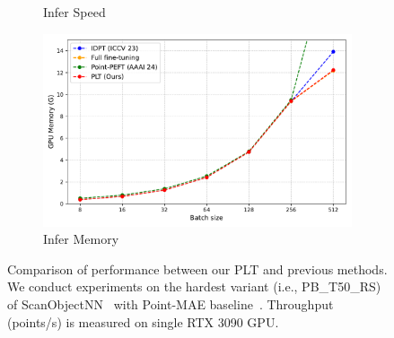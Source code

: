 \begin{figure}
\begin{subfigure}{0.46\textwidth}
        \caption{Infer Speed}
        \label{fig:per3}
    \end{subfigure}
    \hfill
    \begin{subfigure}{0.46\textwidth}
        \centering
        \includegraphics[width=\linewidth]{fig/supplement/performance/infer_memory.pdf}
        \caption{Infer Memory}
        \label{fig:per4}
    \end{subfigure}
    \hfill
    \caption{Comparison of performance between our PLT and previous methods. We conduct experiments on the hardest variant (i.e., PB\_T50\_RS) of ScanObjectNN~\cite{uy2019revisiting} with Point-MAE baseline~\cite{pang2022masked}. Throughput (points/s) is measured on single RTX 3090 GPU.}
    \label{fig:performance}
\end{figure}